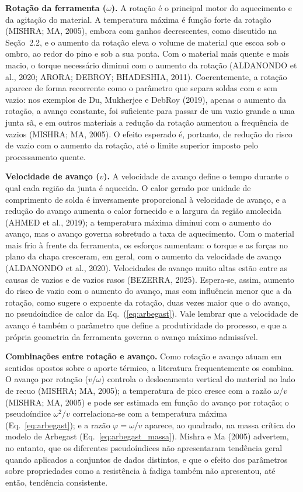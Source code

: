 \documentclass[12pt,openany]{report}
\begin{document}
\textbf{Rotação da ferramenta ($\omega$).} A rotação é o principal motor do aquecimento e da agitação do material. A temperatura máxima é função forte da rotação (MISHRA; MA, 2005), embora com ganhos decrescentes, como discutido na Seção~2.2, e o aumento da rotação eleva o volume de material que escoa sob o ombro, ao redor do pino e sob a sua ponta. Com o material mais quente e mais macio, o torque necessário diminui com o aumento da rotação (ALDANONDO et al., 2020; ARORA; DEBROY; BHADESHIA, 2011). Coerentemente, a rotação aparece de forma recorrente como o parâmetro que separa soldas com e sem vazio: nos exemplos de Du, Mukherjee e DebRoy (2019), apenas o aumento da rotação, a avanço constante, foi suficiente para passar de um vazio grande a uma junta sã, e em outros materiais a redução da rotação aumentou a frequência de vazios (MISHRA; MA, 2005). O efeito esperado é, portanto, de redução do risco de vazio com o aumento da rotação, até o limite superior imposto pelo processamento quente.

\textbf{Velocidade de avanço ($v$).} A velocidade de avanço define o tempo durante o qual cada região da junta é aquecida. O calor gerado por unidade de comprimento de solda é inversamente proporcional à velocidade de avanço, e a redução do avanço aumenta o calor fornecido e a largura da região amolecida (AHMED et al., 2019); a temperatura máxima diminui com o aumento do avanço, mas o avanço governa sobretudo a taxa de aquecimento. Com o material mais frio à frente da ferramenta, os esforços aumentam: o torque e as forças no plano da chapa cresceram, em geral, com o aumento da velocidade de avanço (ALDANONDO et al., 2020). Velocidades de avanço muito altas estão entre as causas de vazios e de vazios rasos (BEZERRA, 2025). Espera-se, assim, aumento do risco de vazio com o aumento do avanço, mas com influência menor que a da rotação, como sugere o expoente da rotação, duas vezes maior que o do avanço, no pseudoíndice de calor da Eq.~(\ref{eq:arbegast}). Vale lembrar que a velocidade de avanço é também o parâmetro que define a produtividade do processo, e que a própria geometria da ferramenta governa o avanço máximo admissível.

\textbf{Combinações entre rotação e avanço.} Como rotação e avanço atuam em sentidos opostos sobre o aporte térmico, a literatura frequentemente os combina. O avanço por rotação ($v/\omega$) controla o deslocamento vertical do material no lado de recuo (MISHRA; MA, 2005); a temperatura de pico cresce com a razão $\omega/v$ (MISHRA; MA, 2005) e pode ser estimada em função do avanço por rotação; o pseudoíndice $\omega^{2}/v$ correlaciona-se com a temperatura máxima (Eq.~\ref{eq:arbegast}); e a razão $\varphi = \omega/v$ aparece, ao quadrado, na massa crítica do modelo de Arbegast (Eq.~\ref{eq:arbegast_massa}). Mishra e Ma (2005) advertem, no entanto, que os diferentes pseudoíndices não apresentaram tendência geral quando aplicados a conjuntos de dados distintos, e que o efeito dos parâmetros sobre propriedades como a resistência à fadiga também não apresentou, até então, tendência consistente.
\end{document}
